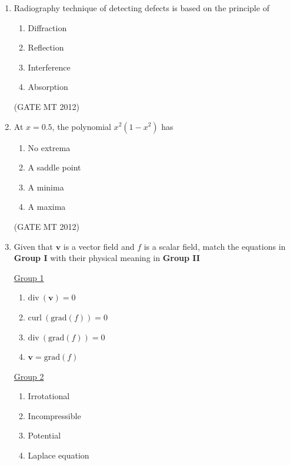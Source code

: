 \documentclass[journal, 11pt, onecolumn]{IEEEtran}
\theoremstyle{remark}
\begin{document}
\begin{enumerate}
\item Radiography technique of detecting defects is based on the principle of

\begin{multicols}{4}
\begin{enumerate}  
\item Diffraction
\item Reflection
\item Interference
\item Absorption
\end{enumerate}
\end{multicols}
\hfill(GATE MT 2012)

\item At \(x=0.5\), the polynomial \(x^2(1-x^2)\) has

\begin{multicols}{4}
\begin{enumerate}  
\item No extrema
\item A saddle point
\item A minima
\item A maxima
\end{enumerate}
\end{multicols}
\hfill(GATE MT 2012)

\item Given that $\mathbf{v}$ is a vector field and $f$ is a scalar field, match the equations in \textbf{Group I} with their physical meaning in \textbf{Group II}
\begin{multicols}{2}
\underline{Group 1}
\begin{enumerate}[label=(\Alph*), start=16]
\item $\mathrm{div}\ (\mathbf{v}) = 0$  
\item $\mathrm{curl}\ (\mathrm{grad}(f)) = 0$
\item $\mathrm{div}\ (\mathrm{grad}(f)) = 0$
\item $\mathbf{v} = \mathrm{grad}(f)$
\end{enumerate}

\underline{Group 2}
\begin{enumerate}[label=(\arabic*), start=1]
\item Irrotational 
\item Incompressible
\item Potential
\item Laplace equation 
\end{enumerate}
\end{multicols}


\end{enumerate}
\end{document}
